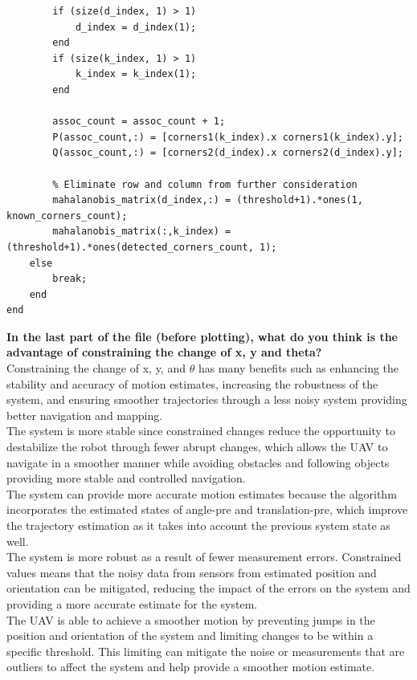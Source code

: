 \begin{enumerate}
\begin{lstlisting}
		if (size(d_index, 1) > 1)
			d_index = d_index(1);
		end
		if (size(k_index, 1) > 1)
			k_index = k_index(1);
		end
					
		assoc_count = assoc_count + 1;
		P(assoc_count,:) = [corners1(k_index).x corners1(k_index).y];
		Q(assoc_count,:) = [corners2(d_index).x corners2(d_index).y];
                    
		% Eliminate row and column from further consideration
		mahalanobis_matrix(d_index,:) = (threshold+1).*ones(1, known_corners_count);
		mahalanobis_matrix(:,k_index) = (threshold+1).*ones(detected_corners_count, 1);
	else
		break;
	end
end
    \end{lstlisting}
\end{enumerate}

\textbf{In the last part of the file (before plotting), what do you think is the advantage of constraining the change of x, y and theta?}\\
Constraining the change of x, y, and $\theta$ has many benefits such as enhancing the stability and accuracy of motion estimates, increasing the robustness of the system, and ensuring smoother trajectories through a less noisy system providing better navigation and mapping.\\

The system is more stable since constrained changes reduce the opportunity to destabilize the robot through fewer abrupt changes, which allows the UAV to navigate in a smoother manner while avoiding obstacles and following objects providing more stable and controlled navigation. \\

The system can provide more accurate motion estimates because the algorithm incorporates the estimated states of angle-pre and translation-pre, which improve the trajectory estimation as it takes into account the previous system state as well. \\

The system is more robust as a result of fewer measurement errors. Constrained values means that the noisy data from sensors from estimated position and orientation can be mitigated, reducing the impact of the errors on the system and providing a more accurate estimate for the system. \\

The UAV is able to achieve a smoother motion by preventing jumps in the position and orientation of the system and limiting changes to be within a specific threshold. This limiting can mitigate the noise or measurements that are outliers to affect the system and help provide a smoother motion estimate.\\

